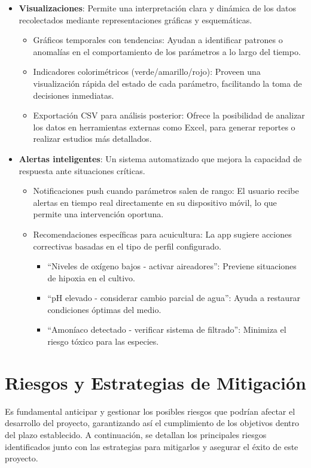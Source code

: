 \documentclass{article}
\begin{document}
\begin{itemize}
\item \textbf{Visualizaciones}: Permite una interpretación clara y dinámica de los datos recolectados mediante representaciones gráficas y esquemáticas.
  \begin{itemize}
  \item Gráficos temporales con tendencias: Ayudan a identificar patrones o anomalías en el comportamiento de los parámetros a lo largo del tiempo.
  \item Indicadores colorimétricos (verde/amarillo/rojo): Proveen una visualización rápida del estado de cada parámetro, facilitando la toma de decisiones inmediatas.
  \item Exportación CSV para análisis posterior: Ofrece la posibilidad de analizar los datos en herramientas externas como Excel, para generar reportes o realizar estudios más detallados.
  \end{itemize}
  
\item \textbf{Alertas inteligentes}: Un sistema automatizado que mejora la capacidad de respuesta ante situaciones críticas.
  \begin{itemize}
  \item Notificaciones push cuando parámetros salen de rango: El usuario recibe alertas en tiempo real directamente en su dispositivo móvil, lo que permite una intervención oportuna.
  \item Recomendaciones específicas para acuicultura: La app sugiere acciones correctivas basadas en el tipo de perfil configurado.
    \begin{itemize}
    \item ``Niveles de oxígeno bajos - activar aireadores'': Previene situaciones de hipoxia en el cultivo.
    \item ``pH elevado - considerar cambio parcial de agua'': Ayuda a restaurar condiciones óptimas del medio.
    \item ``Amoníaco detectado - verificar sistema de filtrado'': Minimiza el riesgo tóxico para las especies.
    \end{itemize}
  \end{itemize}
\end{itemize}



\section{Riesgos y Estrategias de Mitigación}

Es fundamental anticipar y gestionar los posibles riesgos que podrían afectar el desarrollo del proyecto, garantizando así el cumplimiento de los objetivos dentro del plazo establecido. A continuación, se detallan los principales riesgos identificados junto con las estrategias para mitigarlos y asegurar el éxito de este proyecto. 
\end{document}
